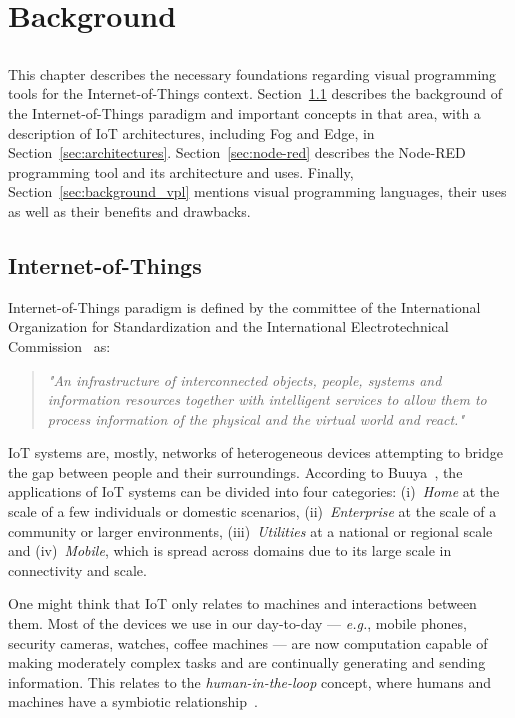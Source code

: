 \chapter{Background} \label{chap:background} \minitoc

\section*{}


This chapter describes the necessary foundations regarding visual programming tools for the Internet-of-Things context. Section~\ref{sec:background_iot} describes the background of the Internet-of-Things paradigm and important concepts in that area, with a description of IoT architectures, including Fog and Edge, in Section~\ref{sec:architectures}. Section~\ref{sec:node-red} describes the Node-RED programming tool and its architecture and uses. Finally, Section~\ref{sec:background_vpl} mentions visual programming languages, their uses as well as their benefits and drawbacks.

\section{Internet-of-Things}\label{sec:background_iot}

Internet-of-Things paradigm is defined by the committee of the International Organization for Standardization and the International Electrotechnical Commission~\cite{ISOIEC} as:

\begin{quote}
    \emph{"An infrastructure of interconnected objects, people, systems and information resources together with intelligent services to allow them to process information of the physical and the virtual world and react."}
\end{quote}

IoT systems are, mostly, networks of heterogeneous devices attempting to bridge the gap between people and their surroundings. According to Buuya~\cite{iot_future_direction}, the applications of IoT systems can be divided into four categories: (i)~\textit{Home} at the scale of a few individuals or domestic scenarios, (ii)~\textit{Enterprise} at the scale of a community or larger environments, (iii)~\textit{Utilities} at a national or regional scale and (iv)~\textit{Mobile}, which is spread across domains due to its large scale in connectivity and scale. 

One might think that IoT only relates to machines and interactions between them. Most of the devices we use in our day-to-day --- \emph{e.g.}, mobile phones, security cameras, watches, coffee machines --- are now computation capable of making moderately complex tasks and are continually generating and sending information. This relates to the \emph{human-in-the-loop} concept, where humans and machines have a symbiotic relationship~\cite{human_in_the_loop_survey}.
 
